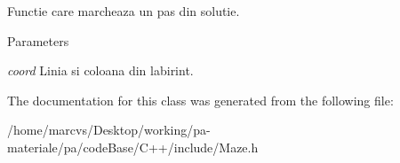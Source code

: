 Functie care marcheaza un pas din solutie. 


\begin{DoxyParams}{Parameters}
\item[{\em coord}]Linia si coloana din labirint. \end{DoxyParams}


The documentation for this class was generated from the following file:\begin{DoxyCompactItemize}
\item 
/home/marcvs/Desktop/working/pa-\/materiale/pa/codeBase/C++/include/Maze.h\end{DoxyCompactItemize}

